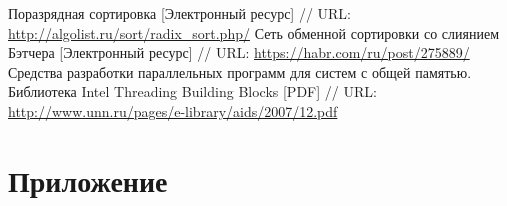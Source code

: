 \documentclass{report}
\begin{document}
\newpage
\begin{thebibliography}{1}
 Поразрядная сортировка [Электронный ресурс] // URL: \url{http://algolist.ru/sort/radix_sort.php/}
 Сеть обменной сортировки со слиянием Бэтчера [Электронный ресурс] // URL: \url{https://habr.com/ru/post/275889/}
 Средства разработки параллельных программ для систем с общей памятью. Библиотека Intel Threading Building Blocks [PDF] // URL: \url{http://www.unn.ru/pages/e-library/aids/2007/12.pdf}
\end{thebibliography}

\newpage
\section*{Приложение}
\end{document}
